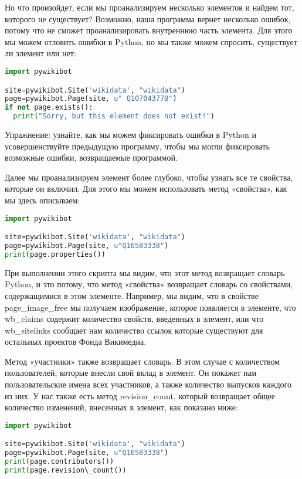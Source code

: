 Но что произойдет, если мы проанализируем несколько элементов и найдем тот, которого не существует? Возможно, наша программа вернет несколько ошибок, потому что не сможет проанализировать внутреннюю часть элемента. Для этого мы можем отловить ошибки в Python, но мы также можем спросить, существует ли элемент или нет:

\begin{lstlisting}[language=Python]
import pywikibot

site=pywikibot.Site('wikidata', "wikidata")
page=pywikibot.Page(site, u" Q107043778")
if not page.exists():
  print("Sorry, but this element does not exist!")
\end{lstlisting}

Упражнение: узнайте, как мы можем фиксировать ошибки в Python и усовершенствуйте предыдущую программу, чтобы мы могли фиксировать возможные ошибки, возвращаемые программой.

Далее мы проанализируем элемент более глубоко, чтобы узнать все те свойства, которые он включил. Для этого мы можем использовать метод «свойства», как мы здесь описываем:

\begin{lstlisting}[language=Python]
import pywikibot

site=pywikibot.Site('wikidata', "wikidata")
page=pywikibot.Page(site, u"Q16583338")
print(page.properties())
\end{lstlisting}

При выполнении этого скрипта мы видим, что этот метод возвращает словарь Python, и это потому, что метод «свойства» возвращает словарь со свойствами, содержащимися в этом элементе. Например, мы видим, что в свойстве page\_image\_free мы получаем изображение, которое появляется в элементе, что wb\_claims содержит количество свойств, введенных в элемент, или что wb\_sitelinks сообщает нам количество ссылок которые существуют для остальных проектов Фонда Викимедиа.

Метод «участники» также возвращает словарь. В этом случае с количеством пользователей, которые внесли свой вклад в элемент. Он покажет нам пользовательские имена всех участников, а также количество выпусков каждого из них. У нас также есть метод revision\_count, который возвращает общее количество изменений, внесенных в элемент, как показано ниже:

\begin{lstlisting}[language=Python]
import pywikibot

site=pywikibot.Site('wikidata', "wikidata")
page=pywikibot.Page(site, u"Q16583338")
print(page.contributors())
print(page.revision\_count())
\end{lstlisting}

